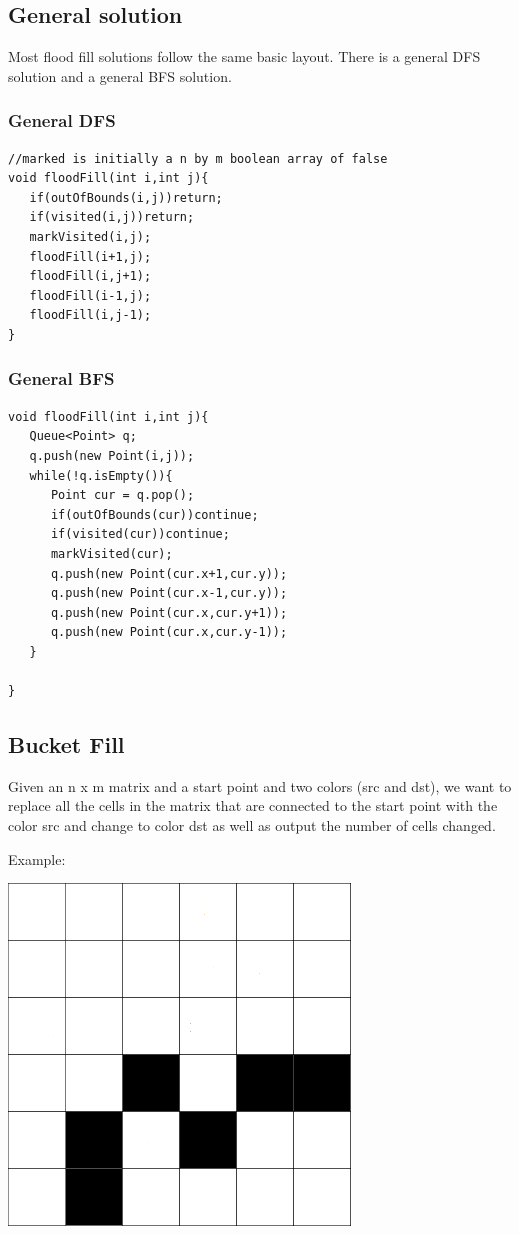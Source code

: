 \documentclass[11pt,oneside]{book}
\makeatletter
\def\maxwidth#1{\ifdim\Gin@nat@width>#1 #1\else\Gin@nat@width\fi}
\makeatother
\begin{document}
\subsection{General solution}

Most flood fill solutions follow the same basic layout. There is a general DFS solution and a general BFS solution.

\subsubsection{General DFS}

\begin{lstlisting}
//marked is initially a n by m boolean array of false
void floodFill(int i,int j){
   if(outOfBounds(i,j))return;
   if(visited(i,j))return;
   markVisited(i,j);
   floodFill(i+1,j);
   floodFill(i,j+1);
   floodFill(i-1,j);
   floodFill(i,j-1);
}
\end{lstlisting}

\subsubsection{General BFS}

\begin{lstlisting}
void floodFill(int i,int j){
   Queue<Point> q;
   q.push(new Point(i,j));
   while(!q.isEmpty()){
      Point cur = q.pop();
      if(outOfBounds(cur))continue;
      if(visited(cur))continue;
      markVisited(cur);
      q.push(new Point(cur.x+1,cur.y));
      q.push(new Point(cur.x-1,cur.y));
      q.push(new Point(cur.x,cur.y+1));
      q.push(new Point(cur.x,cur.y-1));
   }
   
}
\end{lstlisting}

\subsection{Bucket Fill}

Given an n x m matrix and a start point and two colors (src and dst), we want to replace all the cells in the matrix that are connected to the start point with the color src and change to color dst as well as output the number of cells changed.

Example:

\includegraphics[width=\maxwidth{\textwidth}]{bucket.png}
\end{document}

